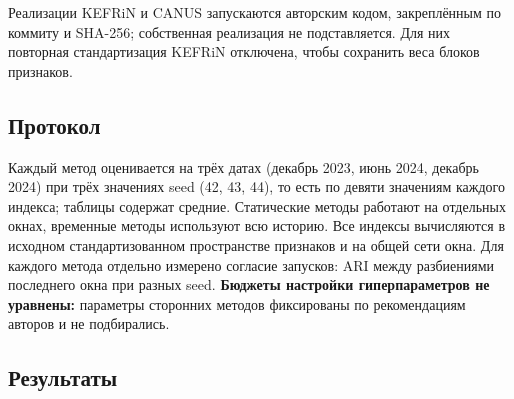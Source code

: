 \documentclass[11pt,a4paper]{article}
\begin{document}
\endgroup

Реализации KEFRiN и CANUS запускаются авторским кодом, закреплённым по коммиту и SHA-256; собственная реализация не подставляется. Для них повторная стандартизация KEFRiN отключена, чтобы сохранить веса блоков признаков.

\subsection{Протокол}\label{ux43fux440ux43eux442ux43eux43aux43eux43b}

Каждый метод оценивается на трёх датах (декабрь 2023, июнь 2024, декабрь 2024) при трёх значениях seed (42, 43, 44), то есть по девяти значениям каждого индекса; таблицы содержат средние. Статические методы работают на отдельных окнах, временные методы используют всю историю. Все индексы вычисляются в исходном стандартизованном пространстве признаков и на общей сети окна. Для каждого метода отдельно измерено согласие запусков: ARI между разбиениями последнего окна при разных seed. \textbf{Бюджеты настройки гиперпараметров не уравнены:} параметры сторонних методов фиксированы по рекомендациям авторов и не подбирались.

\subsection{Результаты}\label{ux440ux435ux437ux443ux43bux44cux442ux430ux442ux44b}

\begingroup\scriptsize\setlength{\tabcolsep}{4pt}
\end{document}
